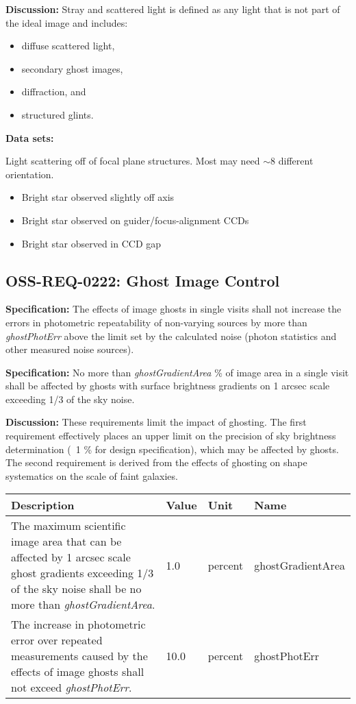 \documentclass[SE,authoryear,toc]{lsstdoc}
\begin{document}
\textbf{Discussion:} Stray and scattered light is defined as any light that is not part of the ideal image and includes:
\begin{itemize}
    \item diffuse scattered light,
    \item secondary ghost images,
    \item diffraction, and
    \item structured glints.
\end{itemize}

\textbf{Data sets:} 

Light scattering off of focal plane structures. Most may need $\sim$8 different orientation.
\begin{itemize}
    \item Bright star observed slightly off axis
    \item Bright star observed on guider/focus-alignment CCDs
    \item Bright star observed in CCD gap
\end{itemize}



\subsection{OSS-REQ-0222: Ghost Image Control}  \label{sec:ghosts}

\textbf{Specification:} The effects of image ghosts in single visits shall not increase the errors in photometric repeatability of non-varying sources by more than \textit{ghostPhotErr} above the limit set by the calculated noise (photon statistics and other measured noise sources). 

\textbf{Specification:} No more than \textit{ghostGradientArea} \% of image area in a single visit shall be affected by ghosts with surface brightness gradients on 1 arcsec scale exceeding 1/3 of the
sky noise.

\textbf{Discussion:} These requirements limit the impact of ghosting. The first requirement effectively places an upper limit on the precision of sky brightness determination (~1 \% for design specification), which may be affected by ghosts. The second requirement is derived from the effects of ghosting on shape systematics on the scale of faint galaxies.

\begin{center}
\begin{tabular}{p{}p{}p{}p{}}\hline
    \textbf{Description} & \textbf{Value} & \textbf{Unit} & \textbf{Name} \\\hline
    The maximum scientific image area that can be affected by 1 arcsec scale ghost gradients exceeding 1/3 of the sky noise shall be no more than \textit{ghostGradientArea}. & 1.0 & percent & ghostGradientArea \\\hline
    The increase in photometric error over repeated measurements caused by the effects of image ghosts shall not exceed \textit{ghostPhotErr}. & 10.0 & percent & ghostPhotErr \\\hline
\end{tabular}
\end{center}
\end{document}
